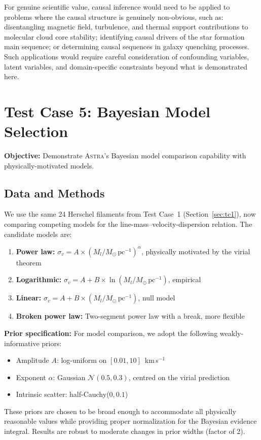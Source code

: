 \documentclass[usenatbib]{rasti}
\newcommand{\astra}{\textsc{Astra}\xspace}
\begin{document}
For genuine scientific value, causal inference would need to be applied to problems where the causal structure is genuinely non-obvious, such as: disentangling magnetic field, turbulence, and thermal support contributions to molecular cloud core stability; identifying causal drivers of the star formation main sequence; or determining causal sequences in galaxy quenching processes.
Such applications would require careful consideration of confounding variables, latent variables, and domain-specific constraints beyond what is demonstrated here.

\section{Test Case 5: Bayesian Model Selection}
\label{sec:tc5}

\textbf{Objective:} Demonstrate \astra's Bayesian model comparison capability with physically-motivated models.

\subsection{Data and Methods}
\label{sec:tc5:data}

We use the same 24 Herschel filaments from Test Case~1 (Section~\ref{sec:tc1}), now comparing competing models for the line-mass--velocity-dispersion relation.
The candidate models are:
\begin{enumerate}
  \item[(i)] \textbf{Power law:} $\sigma_v = A \times (M_l/M_\odot\,\mathrm{pc}^{-1})^{\alpha}$, physically motivated by the virial theorem
  \item[(ii)] \textbf{Logarithmic:} $\sigma_v = A + B \times \ln(M_l/M_\odot\,\mathrm{pc}^{-1})$, empirical
  \item[(iii)] \textbf{Linear:} $\sigma_v = A + B \times (M_l/M_\odot\,\mathrm{pc}^{-1})$, null model
  \item[(iv)] \textbf{Broken power law:} Two-segment power law with a break, more flexible
\end{enumerate}

\textbf{Prior specification:}
For model comparison, we adopt the following weakly-informative priors:
\begin{itemize}
  \item Amplitude $A$: log-uniform on $[0.01, 10]$~km\,s$^{-1}$
  \item Exponent $\alpha$: Gaussian $\mathcal{N}(0.5, 0.3)$, centred on the virial prediction
  \item Intrinsic scatter: half-Cauchy($0, 0.1$)
\end{itemize}
These priors are chosen to be broad enough to accommodate all physically reasonable values while providing proper normalization for the Bayesian evidence integral.
Results are robust to moderate changes in prior widths (factor of 2).
\end{document}
